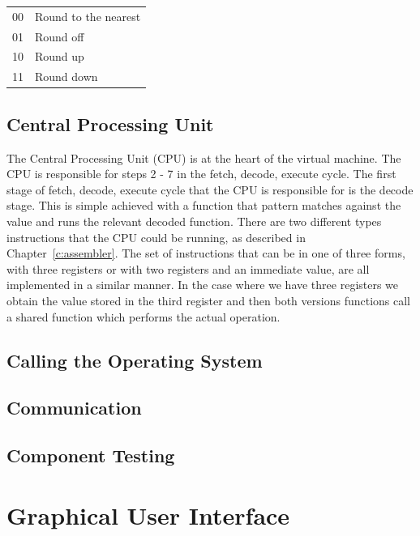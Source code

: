 \documentclass[a4paper,11pt]{report}
\begin{document}
\begin{center}
\begin{tabular}{ c l }
00 & Round to the nearest\\
01 & Round off\\
10 & Round up\\
11 & Round down\\
\end{tabular}
\end{center}

\section{Central Processing Unit}
The Central Processing Unit (CPU) is at the heart of the virtual machine. The CPU is responsible for steps 2 - 7 in the fetch, decode, execute cycle. The first stage of fetch, decode, execute cycle that the CPU is responsible for is the decode stage. This is simple achieved with a function that pattern matches against the value and runs the relevant decoded function. There are two different types instructions that the CPU could be running, as described in Chapter~\ref{c:assembler}. The set of instructions that can be in one of three forms, with three registers or with two registers and an immediate value, are all implemented in a similar manner. In the case where we have three registers we obtain the value stored in the third register and then both versions functions call a shared function which performs the actual operation.


\section{Calling the Operating System}

\section{Communication}

\section{Component Testing}





\chapter{Graphical User Interface}
\end{document}
